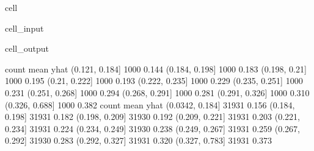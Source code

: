 \documentclass[letterpaper,10pt,english]{jupyterBook}
\begin{document}
\begin{sphinxuseclass}{cell}\begin{sphinxVerbatimInput}

\begin{sphinxuseclass}{cell_input}
\begin{sphinxVerbatim}[commandchars=\\\{\}]
   
      \PYG{p}{[} \PYG{p}{]} 
      \PYG{p}{[}\PYG{p}{]} 
    \PYG{p}{[}\PYG{p}{]}\PYG{p}{[}\PYG{p}{]}
    \PYG{p}{[}\PYG{p}{]}

 
 
\end{sphinxVerbatim}

\end{sphinxuseclass}\end{sphinxVerbatimInput}
\begin{sphinxVerbatimOutput}

\begin{sphinxuseclass}{cell_output}
\begin{sphinxVerbatim}[commandchars=\\\{\}]
                count  mean
yhat                       
(0.121, 0.184]   1000 0.144
(0.184, 0.198]   1000 0.183
(0.198, 0.21]    1000 0.195
(0.21, 0.222]    1000 0.193
(0.222, 0.235]   1000 0.229
(0.235, 0.251]   1000 0.231
(0.251, 0.268]   1000 0.294
(0.268, 0.291]   1000 0.281
(0.291, 0.326]   1000 0.310
(0.326, 0.688]   1000 0.382
                 count  mean
yhat                        
(0.0342, 0.184]  31931 0.156
(0.184, 0.198]   31931 0.182
(0.198, 0.209]   31930 0.192
(0.209, 0.221]   31931 0.203
(0.221, 0.234]   31931 0.224
(0.234, 0.249]   31930 0.238
(0.249, 0.267]   31931 0.259
(0.267, 0.292]   31930 0.283
(0.292, 0.327]   31931 0.320
(0.327, 0.783]   31931 0.373
\end{sphinxVerbatim}


\end{sphinxuseclass}
\end{sphinxVerbatimOutput}
\end{sphinxuseclass}
\end{document}
